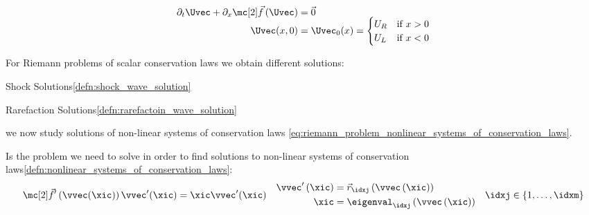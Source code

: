 \begin{defnbox}\nospacing
    \begin{defn}\label{defn:riemann_problem_for_non_linear_systems_of_conservations_laws}
            \begin{align}
              \begin{aligned}
                \partial_{t}\Uvec+\partial_{x}\fluxvec\left(\Uvec\right)&=\vec{0}\\[-2\jot]
                \Uvec(x,0)&=\Uvec_{0}(x)=\begin{cases}
                        U_{R}&\text{if }x>0 \\
                        U_{L}&\text{if }x<0
                \end{cases}
                \end{aligned}\label{eq:riemann_problem_nonlinear_systems_of_conservation_laws}
            \end{align}
        \end{defn}
\end{defnbox}
\begin{sectionbox}[Recall]\nospacing
    For Riemann problems of scalar conservation laws we obtain different solutions:
    \begin{circlelistnosep}
        \item Shock Solutions\cref{defn:shock_wave_solution}
        \item Rarefaction Solutions\cref{defn:rarefactoin_wave_solution}
    \end{circlelistnosep}
    we now study solutions of non-linear systems of conservation laws \cref{eq:riemann_problem_nonlinear_systems_of_conservation_laws}.
\end{sectionbox}
\begin{defnbox}\nospacing
    \begin{defn}\label{defn:eigenvalue_problem_non-lin._sys._of_con.s_laws}
        Is the problem we need to solve in order to find solutions to non-linear systems of conservation laws\cref{defn:nonlinear_systems_of_conservation_laws}:
        \begin{align}
          \fluxvec'\left(\vvec(\xic)\right)\vvec'(\xic)=\xic\vvec'(\xic)&&
          \begin{aligned}
                \vvec'\left(\xic\right)&=\vec{r}_{\idxj}\left(\vvec\left(\xic\right)\right)\\
                \xic&=\eigenval_{\idxj}\left(\vvec\left(\xic\right)\right)
          \end{aligned}&&\idxj\in \left\{1,\ldots,\idxm\right\}\label{eq:eigenvalue_problem_simple_solutions}
        \end{align}
    \end{defn}
\end{defnbox}
